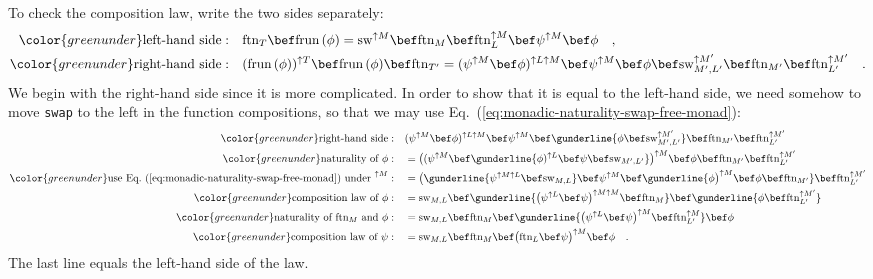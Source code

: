 To check the composition law, write the two sides separately:
\begin{align*}
{\color{greenunder}\text{left-hand side}:}\quad & \text{ftn}_{T}\bef\text{frun}\,(\phi)=\text{sw}^{\uparrow M}\bef\text{ftn}_{M}\bef\text{ftn}_{L}^{\uparrow M}\bef\psi^{\uparrow M}\bef\phi\quad,\\
{\color{greenunder}\text{right-hand side}:}\quad & (\text{frun}\,(\phi))^{\uparrow T}\bef\text{frun}\,(\phi)\bef\text{ftn}_{T^{\prime}}=(\psi^{\uparrow M}\bef\phi)^{\uparrow L\uparrow M}\bef\psi^{\uparrow M}\bef\phi\bef\text{sw}_{M^{\prime},L^{\prime}}^{\uparrow M^{\prime}}\bef\text{ftn}_{M^{\prime}}\bef\text{ftn}_{L^{\prime}}^{\uparrow M^{\prime}}\quad.
\end{align*}
We begin with the right-hand side since it is more complicated. In
order to show that it is equal to the left-hand side, we need somehow
to move \lstinline!swap! to the left in the function compositions,
so that we may use Eq.~(\ref{eq:monadic-naturality-swap-free-monad}):
\begin{align*}
{\color{greenunder}\text{right-hand side}:}\quad & (\psi^{\uparrow M}\bef\phi)^{\uparrow L\uparrow M}\bef\psi^{\uparrow M}\bef\gunderline{\phi\bef\text{sw}_{M^{\prime},L^{\prime}}^{\uparrow M^{\prime}}}\bef\text{ftn}_{M^{\prime}}\bef\text{ftn}_{L^{\prime}}^{\uparrow M^{\prime}}\\
{\color{greenunder}\text{naturality of }\phi:}\quad & =\big((\psi^{\uparrow M}\bef\gunderline{\phi)^{\uparrow L}\bef\psi\bef\text{sw}_{M^{\prime},L^{\prime}}}\big)^{\uparrow M}\bef\phi\bef\text{ftn}_{M^{\prime}}\bef\text{ftn}_{L^{\prime}}^{\uparrow M^{\prime}}\\
{\color{greenunder}\text{use Eq.~(\ref{eq:monadic-naturality-swap-free-monad}) under }^{\uparrow M}:}\quad & =\big(\gunderline{\psi^{\uparrow M\uparrow L}\bef\text{sw}_{M,L}}\bef\psi^{\uparrow M}\bef\gunderline{\phi\big)^{\uparrow M}\bef\phi\bef\text{ftn}_{M^{\prime}}}\bef\text{ftn}_{L^{\prime}}^{\uparrow M^{\prime}}\\
{\color{greenunder}\text{composition law of }\phi:}\quad & =\text{sw}_{M,L}\bef\gunderline{\big(\psi^{\uparrow L}\bef\psi\big)^{\uparrow M\uparrow M}\bef\text{ftn}_{M}}\bef\gunderline{\phi\bef\text{ftn}_{L^{\prime}}^{\uparrow M^{\prime}}}\\
{\color{greenunder}\text{naturality of }\text{ftn}_{M}\text{ and }\phi:}\quad & =\text{sw}_{M,L}\bef\text{ftn}_{M}\bef\gunderline{\big(\psi^{\uparrow L}\bef\psi\big)^{\uparrow M}\bef\text{ftn}_{L^{\prime}}^{\uparrow M}}\bef\phi\\
{\color{greenunder}\text{composition law of }\psi:}\quad & =\text{sw}_{M,L}\bef\text{ftn}_{M}\bef\big(\text{ftn}_{L}\bef\psi\big)^{\uparrow M}\bef\phi\quad.
\end{align*}
The last line equals the left-hand side of the law.

